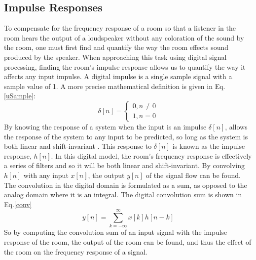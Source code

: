 \documentclass[conference]{IEEEtran}
\begin{document}
    \subsection{Impulse Responses}
        To compensate for the frequency response of a room so that a listener in the room hears the output of a loudspeaker without any coloration of the sound by the room, one must first find and quantify the way the room effects sound produced by the speaker.
        When approaching this task using digital signal processing, finding the room's impulse response allows us to quantify the way it affects any input impulse.
        A digital impulse is a single sample signal with a sample value of 1.
        A more precise mathematical definition is given in Eq.\ref{uSample}:
        \begin{equation}\label{uSample}
            \delta[n] = 
            \begin{cases}
                0, n \neq 0\\
                1, n = 0
            \end{cases}
        \end{equation}
        By knowing the response of a system when the input is an impulse $\delta[n]$, allows the response of the system to any input to be predicted, so long as the system is both linear and shift-invariant \cite{OPPENHEIM}.
        This response to $\delta[n]$ is known as the impulse response, $h[n]$.
        In this digital model, the room's frequency response is effectively a series of filters and so it will be both linear and shift-invariant.
        By convolving $h[n]$ with any input $x[n]$, the output $y[n]$ of the signal flow can be found. 
        The convolution in the digital domain is formulated as a sum, as opposed to the analog domain where it is an integral.
        The digital convolution sum is shown in Eq.\ref{conv}
        \begin{equation}\label{conv}
            y[n] = \sum_{k=-\infty}^\infty x[k] h[n-k]
        \end{equation}
        So by computing the convolution sum of an input signal with the impulse response of the room, the output of the room can be found, and thus the effect of the room on the frequency response of a signal.
\end{document}
